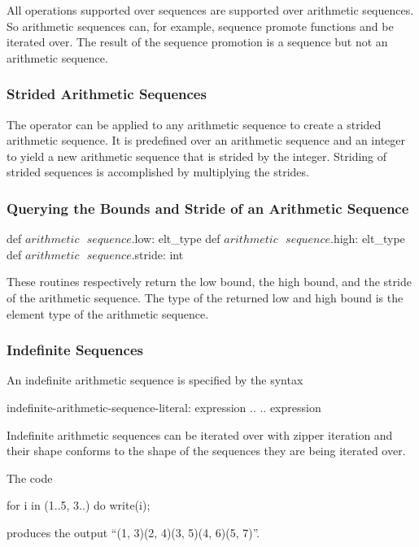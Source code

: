 All operations supported over sequences are supported over arithmetic
sequences.  So arithmetic sequences can, for example, sequence promote
functions and be iterated over.  The result of the sequence promotion
is a sequence but not an arithmetic sequence.

\subsubsection{Strided Arithmetic Sequences}
\label{Strided_Arithmetic_Sequences}

The  operator can be applied to any arithmetic sequence to
create a strided arithmetic sequence.  It is predefined over an
arithmetic sequence and an integer to yield a new arithmetic sequence
that is strided by the integer.  Striding of strided sequences is
accomplished by multiplying the strides.

\subsubsection{Querying the Bounds and Stride of an Arithmetic Sequence}

\begin{protohead}
def $arithmetic\mbox{ }sequence$.low: elt_type
def $arithmetic\mbox{ }sequence$.high: elt_type
def $arithmetic\mbox{ }sequence$.stride: int
\end{protohead}
\begin{protobody}
These routines respectively return the low bound, the high bound, and
the stride of the arithmetic sequence.  The type of the returned low
and high bound is the element type of the arithmetic sequence.
\end{protobody}

\subsubsection{Indefinite Sequences}
\label{Indefinite_Sequences}

An indefinite arithmetic sequence is specified by the syntax
\begin{syntax}
indefinite-arithmetic-sequence-literal:
  expression ..
  .. expression
\end{syntax}

Indefinite arithmetic sequences can be iterated over with zipper
iteration and their shape conforms to the shape of the sequences they
are being iterated over.
\begin{example}
The code
\begin{chapel}
for i in (1..5, 3..) do
  write(i);
\end{chapel}
produces the output ``(1, 3)(2, 4)(3, 5)(4, 6)(5, 7)''.
\end{example}

